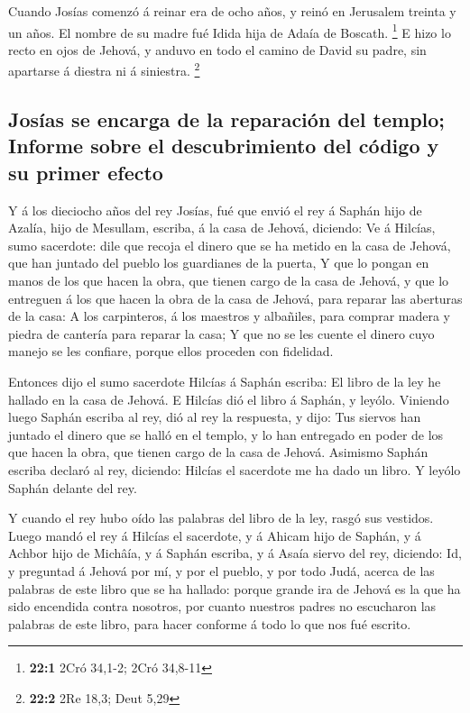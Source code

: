  Cuando Josías comenzó á reinar era de ocho años, y reinó en
Jerusalem treinta y un años. El nombre de su madre fué Idida hija de
Adaía de Boscath. \footnote{\textbf{22:1} 2Cró 34,1-2; 2Cró 34,8-11}
 E hizo lo recto en ojos de Jehová, y anduvo en todo el
camino de David su padre, sin apartarse á diestra ni á siniestra.
\footnote{\textbf{22:2} 2Re 18,3; Deut 5,29}

\hypertarget{josuxedas-se-encarga-de-la-reparaciuxf3n-del-templo-informe-sobre-el-descubrimiento-del-cuxf3digo-y-su-primer-efecto}{%
\subsection{Josías se encarga de la reparación del templo; Informe sobre
el descubrimiento del código y su primer
efecto}\label{josuxedas-se-encarga-de-la-reparaciuxf3n-del-templo-informe-sobre-el-descubrimiento-del-cuxf3digo-y-su-primer-efecto}}

 Y á los dieciocho años del rey Josías, fué que envió el rey
á Saphán hijo de Azalía, hijo de Mesullam, escriba, á la casa de Jehová,
diciendo:  Ve á Hilcías, sumo sacerdote: dile que recoja el
dinero que se ha metido en la casa de Jehová, que han juntado del pueblo
los guardianes de la puerta,  Y que lo pongan en manos de
los que hacen la obra, que tienen cargo de la casa de Jehová, y que lo
entreguen á los que hacen la obra de la casa de Jehová, para reparar las
aberturas de la casa:  A los carpinteros, á los maestros y
albañiles, para comprar madera y piedra de cantería para reparar la
casa;  Y que no se les cuente el dinero cuyo manejo se les
confiare, porque ellos proceden con fidelidad.

 Entonces dijo el sumo sacerdote Hilcías á Saphán escriba:
El libro de la ley he hallado en la casa de Jehová. E Hilcías dió el
libro á Saphán, y leyólo.  Viniendo luego Saphán escriba al
rey, dió al rey la respuesta, y dijo: Tus siervos han juntado el dinero
que se halló en el templo, y lo han entregado en poder de los que hacen
la obra, que tienen cargo de la casa de Jehová.  Asimismo
Saphán escriba declaró al rey, diciendo: Hilcías el sacerdote me ha dado
un libro. Y leyólo Saphán delante del rey.

 Y cuando el rey hubo oído las palabras del libro de la
ley, rasgó sus vestidos.  Luego mandó el rey á Hilcías el
sacerdote, y á Ahicam hijo de Saphán, y á Achbor hijo de Michâía, y á
Saphán escriba, y á Asaía siervo del rey, diciendo:  Id, y
preguntad á Jehová por mí, y por el pueblo, y por todo Judá, acerca de
las palabras de este libro que se ha hallado: porque grande ira de
Jehová es la que ha sido encendida contra nosotros, por cuanto nuestros
padres no escucharon las palabras de este libro, para hacer conforme á
todo lo que nos fué escrito.

